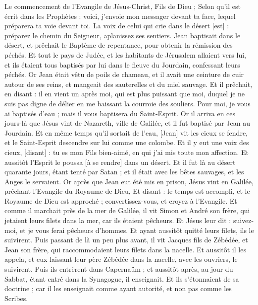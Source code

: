\BFont
\begin{multicols}{2}
\VerseOne{}Le commencement de l'Evangile de Jésus-Christ, Fils de Dieu ;
Selon qu'il est écrit dans les Prophètes : voici, j'envoie mon messager devant ta face, lequel préparera ta voie devant toi.
La voix de celui qui crie dans le désert [est] : préparez le chemin du Seigneur, aplanissez ses sentiers.
Jean baptisait dans le désert, et prêchait le Baptême de repentance, pour obtenir la rémission des péchés.
Et tout le pays de Judée, et les habitants de Jérusalem allaient vers lui, et ils étaient tous baptisés par lui dans le fleuve du Jourdain, confessant leurs péchés.
Or Jean était vêtu de poils de chameau, et il avait une ceinture de cuir autour de ses reins, et mangeait des sauterelles et du miel sauvage.
Et il prêchait, en disant : il en vient un après moi, qui est plus puissant que moi, duquel je ne suis pas digne de délier en me baissant la courroie des souliers.
Pour moi, je vous ai baptisés d'eau ; mais il vous baptisera du Saint-Esprit.
Or il arriva en ces jours-là que Jésus vint de Nazareth, ville de Galilée, et il fut baptisé par Jean au Jourdain.
Et en même temps qu'il sortait de l'eau, [Jean] vit les cieux se fendre, et le Saint-Esprit descendre sur lui comme une colombe.
Et il y eut une voix des cieux, [disant] : tu es mon Fils bien-aimé, en qui j'ai mis toute mon affection.
Et aussitôt l'Esprit le poussa [à se rendre] dans un désert.
Et il fut là au désert quarante jours, étant tenté par Satan ; et il était avec les bêtes sauvages, et les Anges le servaient.
Or après que Jean eut été mis en prison, Jésus vint en Galilée, prêchant l'Evangile du Royaume de Dieu,
Et disant : le temps est accompli, et le Royaume de Dieu est approché ; convertissez-vous, et croyez à l'Evangile.
Et comme il marchait près de la mer de Galilée, il vit Simon et André son frère, qui jetaient leurs filets dans la mer, car ils étaient pêcheurs.
Et Jésus leur dit : suivez-moi, et je vous ferai pêcheurs d'hommes.
Et ayant aussitôt quitté leurs filets, ils le suivirent.
Puis passant de là un peu plus avant, il vit Jacques fils de Zébédée, et Jean son frère, qui raccommodaient leurs filets dans la nacelle.
Et aussitôt il les appela, et eux laissant leur père Zébédée dans la nacelle, avec les ouvriers, le suivirent.
Puis ils entrèrent dans Capernaüm ; et aussitôt après, au jour du Sabbat, étant entré dans la Synagogue, il enseignait.
Et ils s'étonnaient de sa doctrine ; car il les enseignait comme ayant autorité, et non pas comme les Scribes.

\end{multicols}
